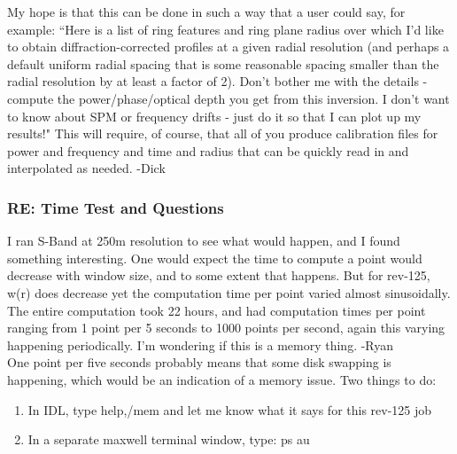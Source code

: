\documentclass[crop=false,class=article,oneside]{standalone}
\begin{document}
My hope is that this can be done in such a way that a user could say, for example: ``Here is a list of ring features and ring plane radius over which I'd like to obtain diffraction-corrected profiles at a given radial resolution (and perhaps a default uniform radial spacing that is some reasonable spacing smaller than the radial resolution by at least a factor of 2). Don't bother me with the details - compute the power/phase/optical depth you get from this inversion. I don't want to know about SPM or frequency drifts - just do it so that I can plot up my results!" This will require, of course, that all of you produce calibration files for power and frequency and time and radius that can be quickly read in and interpolated as needed. -Dick
\subsubsection{\footnotesize RE: Time Test and Questions}
I ran S-Band at 250m resolution to see what would happen, and I found something interesting.
One would expect the time to compute a point would decrease with window size, and to some extent that happens. But for rev-125, w(r) does decrease yet the computation time per point varied almost sinusoidally. The entire computation took 22 hours, and had computation times per point ranging from 1 point per 5 seconds to 1000 points per second, again this varying happening periodically. I'm wondering if this is a memory thing. -Ryan\\
One point per five seconds probably means that some disk swapping is happening, which would be an indication of a memory issue. Two things to do:
\begin{enumerate}
    \item In IDL, type help,/mem and let me know what it says for this rev-125 job
    \item In a separate maxwell terminal window, type: ps au
\end{enumerate}
\end{document}
